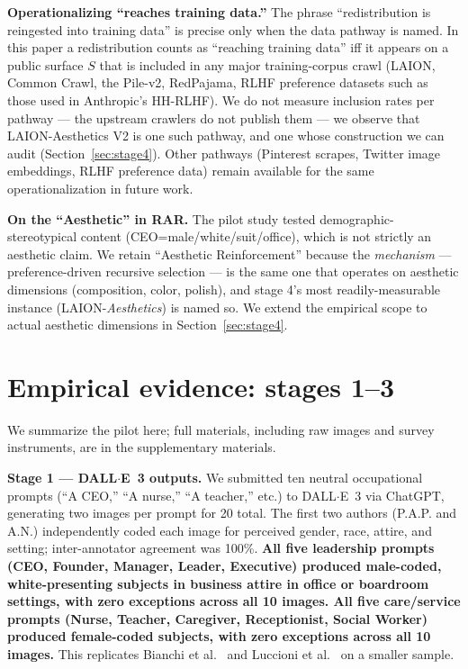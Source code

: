 \documentclass[sigconf,nonacm]{acmart}
\begin{document}
\textbf{Operationalizing ``reaches training data.''} The phrase ``redistribution is reingested into training data'' is precise only when the data pathway is named. In this paper a redistribution counts as ``reaching training data'' iff it appears on a public surface \(S\) that is included in any major training-corpus crawl (LAION, Common Crawl, the Pile-v2, RedPajama, RLHF preference datasets such as those used in Anthropic's HH-RLHF). We do not measure inclusion rates per pathway --- the upstream crawlers do not publish them --- we observe that LAION-Aesthetics V2 is one such pathway, and one whose construction we can audit (Section~\ref{sec:stage4}). Other pathways (Pinterest scrapes, Twitter image embeddings, RLHF preference data) remain available for the same operationalization in future work.

\textbf{On the ``Aesthetic'' in RAR.} The pilot study tested demographic-stereotypical content (CEO=male/white/suit/office), which is not strictly an aesthetic claim. We retain ``Aesthetic Reinforcement'' because the \emph{mechanism} --- preference-driven recursive selection --- is the same one that operates on aesthetic dimensions (composition, color, polish), and stage 4's most readily-measurable instance (LAION-\emph{Aesthetics}) is named so. We extend the empirical scope to actual aesthetic dimensions in Section~\ref{sec:stage4}.

\section{Empirical evidence: stages 1--3}

We summarize the pilot here; full materials, including raw images and survey instruments, are in the supplementary materials.

\textbf{Stage 1 --- DALL$\cdot$E~3 outputs.} We submitted ten neutral occupational prompts (``A CEO,'' ``A nurse,'' ``A teacher,'' etc.) to DALL$\cdot$E~3 via ChatGPT, generating two images per prompt for 20 total. The first two authors (P.A.P. and A.N.) independently coded each image for perceived gender, race, attire, and setting; inter-annotator agreement was 100\%. \textbf{All five leadership prompts (CEO, Founder, Manager, Leader, Executive) produced male-coded, white-presenting subjects in business attire in office or boardroom settings, with zero exceptions across all 10 images. All five care/service prompts (Nurse, Teacher, Caregiver, Receptionist, Social Worker) produced female-coded subjects, with zero exceptions across all 10 images.} This replicates Bianchi et al.~\cite{bianchi2023easily} and Luccioni et al.~\cite{luccioni2023stable} on a smaller sample.
\end{document}
